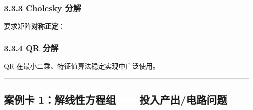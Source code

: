 \subsubsection{3.3.3 Cholesky 分解}\label{cholesky-ux5206ux89e3}

要求矩阵\textbf{对称正定}：

\begin{Shaded}
\begin{Highlighting}[]
\OperatorTok{=}\NormalTok{ np.array([[}\NormalTok{, }\NormalTok{], [}\NormalTok{, }\NormalTok{]])}
\OperatorTok{=}
\CommentTok{\# [[2. 0. ][1. 1.4142]]}
\end{Highlighting}
\end{Shaded}

\subsubsection{3.3.4 QR 分解}\label{qr-ux5206ux89e3}

\begin{Shaded}
\begin{Highlighting}[]
\OperatorTok{=}\NormalTok{ np.array([[}\NormalTok{, }\OperatorTok{{-}}\NormalTok{], [}\NormalTok{, }\NormalTok{], [}\OperatorTok{{-}}\NormalTok{, }\NormalTok{]])}
\OperatorTok{=}
\end{Highlighting}
\end{Shaded}

QR 在最小二乘、特征值算法稳定实现中广泛使用。

\begin{center}\rule{0.5\linewidth}{0.5pt}\end{center}

\subsection{案例卡
1：解线性方程组------投入产出/电路问题}\label{ux6848ux4f8bux5361-1ux89e3ux7ebfux6027ux65b9ux7a0bux7ec4ux6295ux5165ux4ea7ux51faux7535ux8defux95eeux9898}

